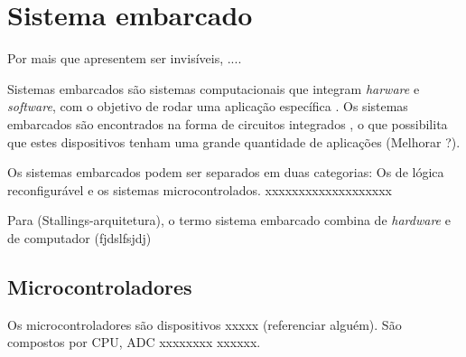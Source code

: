 \vspace{1cm}
\section{Sistema embarcado}

Por mais que apresentem ser invisíveis, ....


Sistemas embarcados são sistemas computacionais que integram \textit{harware} e \textit{software}, com o objetivo de 
rodar uma aplicação específica \cite{embedded}. Os sistemas embarcados são encontrados na forma de circuitos integrados 
, o que possibilita que estes dispositivos tenham uma grande quantidade de aplicações (Melhorar ?). 

Os sistemas embarcados podem ser separados em duas categorias: Os de lógica reconfigurável e os sistemas microcontrolados.
xxxxxxxxxxxxxxxxxxx



Para (Stallings-arquitetura), o termo sistema embarcado combina de \textit{hardware} e  de computador (fjdslfsjdj)


\subsection{Microcontroladores}

Os microcontroladores são dispositivos xxxxx (referenciar alguém).
São compostos por CPU, ADC xxxxxxxx xxxxxx.



\vspace{1cm}
